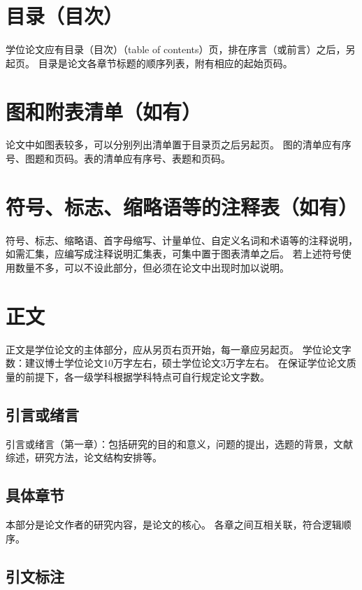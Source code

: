 \section{目录（目次）}

学位论文应有目录（目次）（table of contents）页，排在序言（或前言）之后，另起页。
目录是论文各章节标题的顺序列表，附有相应的起始页码。

\section{图和附表清单（如有）}

论文中如图表较多，可以分别列出清单置于目录页之后另起页。
图的清单应有序号、图题和页码。表的清单应有序号、表题和页码。

\section{符号、标志、缩略语等的注释表（如有）}

符号、标志、缩略语、首字母缩写、计量单位、自定义名词和术语等的注释说明，如需汇集，应编写成注释说明汇集表，可集中置于图表清单之后。
若上述符号使用数量不多，可以不设此部分，但必须在论文中出现时加以说明。

\section{正文}

正文是学位论文的主体部分，应从另页右页开始，每一章应另起页。
学位论文字数：建议博士学位论文10万字左右，硕士学位论文3万字左右。
在保证学位论文质量的前提下，各一级学科根据学科特点可自行规定论文字数。

\subsection{引言或绪言}

引言或绪言（第一章）：包括研究的目的和意义，问题的提出，选题的背景，文献综述，研究方法，论文结构安排等。

\subsection{具体章节}

本部分是论文作者的研究内容，是论文的核心。
各章之间互相关联，符合逻辑顺序。

\subsection{引文标注}

